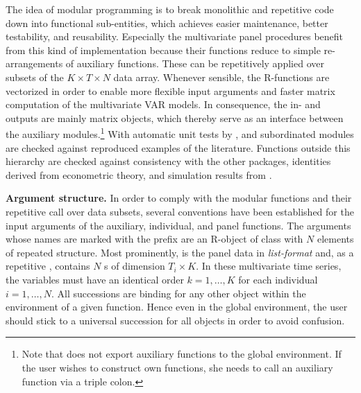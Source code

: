 The idea of modular programming is to break monolithic and repetitive code down into functional sub-entities, which achieves easier maintenance, better testability, and reusability. Especially the multivariate panel procedures benefit from this kind of implementation because their functions reduce to simple re-arrangements of auxiliary functions. These can be repetitively applied over subsets of the $ K \times T \times N $ data array. Whenever sensible, the \textsf{R}-functions are vectorized in order to enable more flexible input arguments and faster matrix computation of the multivariate VAR models. In consequence, the in- and outputs are mainly matrix objects, which thereby serve as an interface between the auxiliary modules.\footnote{Note that  does not export auxiliary functions to the global environment. If the user wishes to construct own functions, she needs to call an auxiliary function \mbox{} via a triple colon.} With automatic unit tests by  \citep{Hadley2011}, \mbox{} and subordinated modules are checked against reproduced examples of the literature. Functions outside this hierarchy are checked against consistency with the other  packages, identities derived from econometric theory, and simulation results from \citet{EmptingEtAl2024}.


\textbf{Argument structure.} In order to comply with the modular functions and their repetitive call over data subsets, several conventions have been established for the input arguments of the auxiliary, individual, and panel functions. The arguments whose names are marked with the prefix \mbox{} are an \textsf{R}-object of class  with $ N $ elements of repeated structure. Most prominently,  is the panel data in \textit{list-format} and, as a repetitive , contains $ N $ s of dimension $ T_i \times K $. In these multivariate time series, the variables must have an identical order $ k = 1, \ldots , K $ for each individual $ i = 1,\ldots,N $. All successions are binding for any other  object within the environment of a given function. Hence even in the global environment, the user should stick to a universal succession for all  objects in order to avoid confusion.

